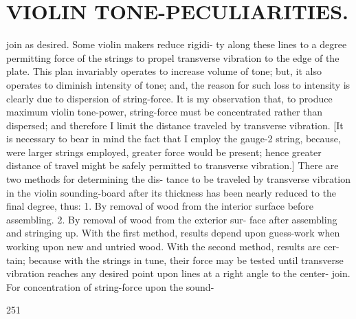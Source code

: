 \documentclass{article}
\begin{document}
\section*{VIOLIN TONE-PECULIARITIES.}
join as desired. Some violin makers reduce rigidi- ty along these lines to a degree permitting force of the strings to propel transverse vibration to the edge of the plate. This plan invariably operates to increase volume of tone; but, it also operates to diminish intensity of tone; and, the reason for such loss to intensity is clearly due to dispersion of string-force. It is my observation that, to produce maximum violin tone-power, string-force must be concentrated rather than dispersed; and therefore I limit the distance traveled by transverse vibration. [It is necessary to bear in mind the fact that I employ the gauge-2 string, because, were larger strings employed, greater force would be present; hence greater distance of travel might be safely permitted to transverse vibration.] There are two methods for determining the dis- tance to be traveled by transverse vibration in the violin sounding-board after its thickness has been nearly reduced to the final degree, thus: 1. By removal of wood from the interior surface before assembling. 2. By removal of wood from the exterior sur- face after assembling and stringing up. With the first method, results depend upon guess-work when working upon new and untried wood. With the second method, results are cer- tain; because with the strings in tune, their force may be tested until transverse vibration reaches any desired point upon lines at a right angle to the center- join. For concentration of string-force upon the sound-

251
\end{document}
